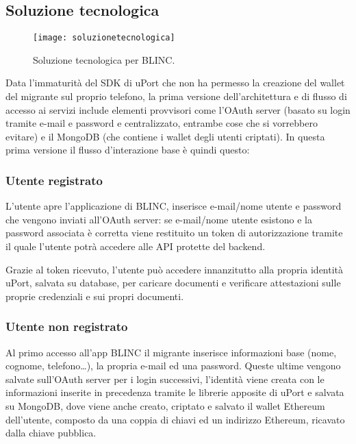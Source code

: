 \subsection{Soluzione tecnologica}

\begin{figure}[!ht]
    \texttt{[image: soluzionetecnologica]}
    \caption{Soluzione tecnologica per BLINC.}
    \label{fig:soluzionetecnologica}
\end{figure}

Data l’immaturità del SDK di uPort che non ha permesso la creazione del wallet del migrante sul proprio telefono, la prima versione 
dell’architettura e di flusso di accesso ai servizi include elementi provvisori come l’OAuth server
(basato su login tramite e-mail e password e centralizzato, 
entrambe cose che si vorrebbero evitare) e il MongoDB (che contiene i wallet degli utenti criptati).	
In questa prima versione il flusso d’interazione base è quindi questo:

\subsubsection{Utente registrato}

L’utente apre l’applicazione di BLINC, inserisce e-mail/nome utente e password che vengono inviati all’OAuth server:
se e-mail/nome utente esistono e la password associata è corretta viene restituito un token di autorizzazione
tramite il quale l’utente
potrà accedere alle API protette del backend.

Grazie al token ricevuto, l’utente può accedere innanzitutto alla propria identità uPort, salvata su database, 
per caricare documenti e verificare attestazioni sulle proprie credenziali e sui propri documenti.


\subsubsection{Utente non registrato}

Al primo accesso all’app BLINC il migrante inserisce informazioni base (nome, cognome, telefono…),
la propria e-mail ed una password. Queste ultime vengono salvate sull’OAuth server per i login successivi, 
l’identità viene creata con le informazioni inserite in precedenza tramite le librerie apposite di uPort 
e salvata su MongoDB, dove viene anche creato, criptato e salvato il wallet Ethereum dell’utente,
composto da una coppia di chiavi ed un indirizzo Ethereum, ricavato dalla chiave pubblica.
